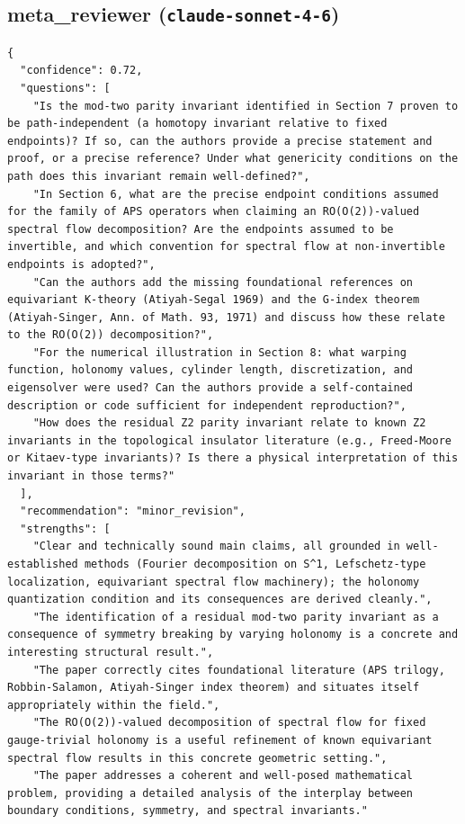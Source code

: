 \documentclass[11pt]{article}
\begin{document}
\subsection*{meta_reviewer (\texttt{claude-sonnet-4-6})}
\begin{verbatim}
{
  "confidence": 0.72,
  "questions": [
    "Is the mod-two parity invariant identified in Section 7 proven to be path-independent (a homotopy invariant relative to fixed endpoints)? If so, can the authors provide a precise statement and proof, or a precise reference? Under what genericity conditions on the path does this invariant remain well-defined?",
    "In Section 6, what are the precise endpoint conditions assumed for the family of APS operators when claiming an RO(O(2))-valued spectral flow decomposition? Are the endpoints assumed to be invertible, and which convention for spectral flow at non-invertible endpoints is adopted?",
    "Can the authors add the missing foundational references on equivariant K-theory (Atiyah-Segal 1969) and the G-index theorem (Atiyah-Singer, Ann. of Math. 93, 1971) and discuss how these relate to the RO(O(2)) decomposition?",
    "For the numerical illustration in Section 8: what warping function, holonomy values, cylinder length, discretization, and eigensolver were used? Can the authors provide a self-contained description or code sufficient for independent reproduction?",
    "How does the residual Z2 parity invariant relate to known Z2 invariants in the topological insulator literature (e.g., Freed-Moore or Kitaev-type invariants)? Is there a physical interpretation of this invariant in those terms?"
  ],
  "recommendation": "minor_revision",
  "strengths": [
    "Clear and technically sound main claims, all grounded in well-established methods (Fourier decomposition on S^1, Lefschetz-type localization, equivariant spectral flow machinery); the holonomy quantization condition and its consequences are derived cleanly.",
    "The identification of a residual mod-two parity invariant as a consequence of symmetry breaking by varying holonomy is a concrete and interesting structural result.",
    "The paper correctly cites foundational literature (APS trilogy, Robbin-Salamon, Atiyah-Singer index theorem) and situates itself appropriately within the field.",
    "The RO(O(2))-valued decomposition of spectral flow for fixed gauge-trivial holonomy is a useful refinement of known equivariant spectral flow results in this concrete geometric setting.",
    "The paper addresses a coherent and well-posed mathematical problem, providing a detailed analysis of the interplay between boundary conditions, symmetry, and spectral invariants."

\end{verbatim}
\end{document}
